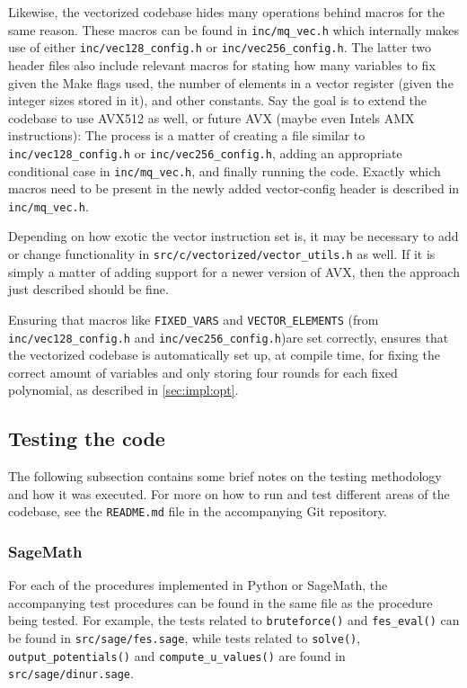 Likewise, the vectorized codebase hides many operations behind macros for the same reason. These macros can be found in \texttt{inc/mq\_vec.h} which internally makes use of either \texttt{inc/vec128\_config.h} or \texttt{inc/vec256\_config.h}. The latter two header files also include relevant macros for stating how many variables to fix given the Make flags used, the number of elements in a vector register (given the integer sizes stored in it), and other constants. Say the goal is to extend the codebase to use AVX512 as well, or future AVX (maybe even Intels AMX instructions): The process is a matter of creating a file similar to \texttt{inc/vec128\_config.h} or \texttt{inc/vec256\_config.h}, adding an appropriate conditional case in \texttt{inc/mq\_vec.h}, and finally running the code. Exactly which macros need to be present in the newly added vector-config header is described in \texttt{inc/mq\_vec.h}. 

Depending on how exotic the vector instruction set is, it may be necessary to add or change functionality in \texttt{src/c/vectorized/vector\_utils.h} as well. If it is simply a matter of adding support for a newer version of AVX, then the approach just described should be fine.

Ensuring that macros like \texttt{FIXED\_VARS} and \texttt{VECTOR\_ELEMENTS} (from \texttt{inc/vec128\_config.h} and \texttt{inc/vec256\_config.h})are set correctly, ensures that the vectorized codebase is automatically set up, at compile time, for fixing the correct amount of variables and only storing four rounds for each fixed polynomial, as described in \cref{sec:impl:opt}.

\subsection{Testing the code}
The following subsection contains some brief notes on the testing methodology and how it was executed. For more on how to run and test different areas of the codebase, see the \texttt{README.md} file in the accompanying Git repository.

\subsubsection{SageMath}

For each of the procedures implemented in Python or SageMath, the accompanying test procedures can be found in the same file as the procedure being tested. For example, the tests related to \texttt{bruteforce()} and \texttt{fes\_eval()} can be found in \texttt{src/sage/fes.sage}, while tests related to \texttt{solve()}, \texttt{output\_potentials()} and \texttt{compute\_u\_values()} are found in \texttt{src/sage/dinur.sage}.


